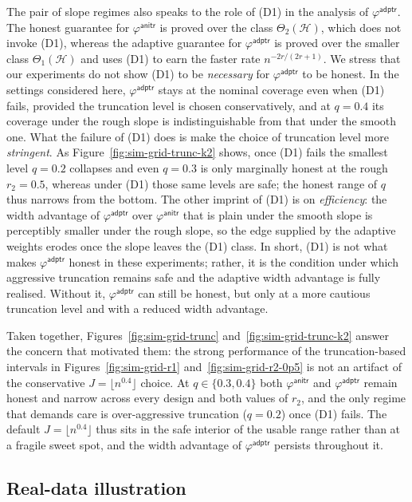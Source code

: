\documentclass[aos]{imsart}
\newcommand{\mH}{\mathcal H}
\newcommand{\anitr}{\mathsf{anitr}}
\newcommand{\adptr}{\mathsf{adptr}}
\theoremstyle{plain}
\theoremstyle{definition}
\theoremstyle{definition}
\begin{document}
The pair of slope regimes also speaks to the role of (D1) in the analysis of $\varphi^{\adptr}$. The honest guarantee for $\varphi^{\anitr}$ is proved over the class $\Theta_2(\mH)$, which does not invoke (D1), whereas the adaptive guarantee for $\varphi^{\adptr}$ is proved over the smaller class $\Theta_1(\mH)$ and uses (D1) to earn the faster rate $n^{-2r/(2r+1)}$. We stress that our experiments do not show (D1) to be \emph{necessary} for $\varphi^{\adptr}$ to be honest. In the settings considered here, $\varphi^{\adptr}$ stays at the nominal coverage even when (D1) fails, provided the truncation level is chosen conservatively, and at $q=0.4$ its coverage under the rough slope is indistinguishable from that under the smooth one. What the failure of (D1) does is make the choice of truncation level more \emph{stringent}. As Figure~\ref{fig:sim-grid-trunc-k2} shows, once (D1) fails the smallest level $q=0.2$ collapses and even $q=0.3$ is only marginally honest at the rough $r_2=0.5$, whereas under (D1) those same levels are safe; the honest range of $q$ thus narrows from the bottom. The other imprint of (D1) is on \emph{efficiency}: the width advantage of $\varphi^{\adptr}$ over $\varphi^{\anitr}$ that is plain under the smooth slope is perceptibly smaller under the rough slope, so the edge supplied by the adaptive weights erodes once the slope leaves the (D1) class. In short, (D1) is not what makes $\varphi^{\adptr}$ honest in these experiments; rather, it is the condition under which aggressive truncation remains safe and the adaptive width advantage is fully realised. Without it, $\varphi^{\adptr}$ can still be honest, but only at a more cautious truncation level and with a reduced width advantage.

Taken together, Figures~\ref{fig:sim-grid-trunc} and~\ref{fig:sim-grid-trunc-k2} answer the concern that motivated them: the strong performance of the truncation-based intervals in Figures~\ref{fig:sim-grid-r1} and~\ref{fig:sim-grid-r2-0p5} is not an artifact of the conservative $J=\lfloor n^{0.4}\rfloor$ choice. At $q\in\{0.3,0.4\}$ both $\varphi^{\anitr}$ and $\varphi^{\adptr}$ remain honest and narrow across every design and both values of $r_2$, and the only regime that demands care is over-aggressive truncation ($q=0.2$) once (D1) fails. The default $J=\lfloor n^{0.4}\rfloor$ thus sits in the safe interior of the usable range rather than at a fragile sweet spot, and the width advantage of $\varphi^{\adptr}$ persists throughout it.

\subsection{Real-data illustration}\label{subsec:sim-real-data}
\end{document}
